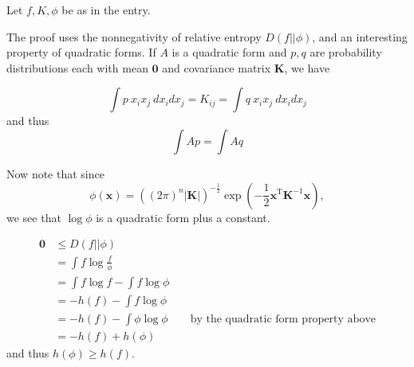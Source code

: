 \documentclass{article}
\newcommand{\mv}[1]{\mathbf{#1}}	%
\newcommand{\mvt}[1]{\mv{#1}^{\mathrm{T}}}
\begin{document}
Let $f, K, \phi$ be as in the  entry.

The proof uses the nonnegativity of relative entropy $D(f||\phi)$, and an interesting  property of quadratic forms.  If $A$ is a quadratic form and $p,q$ are probability distributions each with mean $\mv{0}$ and covariance matrix $\mv{K}$, we have

\begin{equation}
\int p\ x_i x_j\ dx_i dx_j = K_{ij} = \int q\ x_i x_j\ dx_i dx_j
\end{equation}
and thus
\begin{equation}
\int A p = \int A q
\end{equation}

Now note that since
\begin{equation}
\phi(\mv{x}) = \left((2\pi)^n |\mv{K}| \right)^{-\frac{1}{2}} \exp{(- \frac{1}{2} \mvt{x} \mv{K}^{-1} \mv{x})},
\end{equation}
we see that $\log \phi$ is a quadratic form plus a constant.

\begin{eqnarray*}
\textbf{0} &\le D(f||\phi)\\
&= \int f \log \frac{f}{\phi}\\
&= \int f \log f - \int f \log \phi\\
&= -h(f) - \int f \log \phi\\
&= -h(f) - \int \phi \log \phi \qquad \text{by the quadratic form property above}\\
&= -h(f) + h(\phi)
\end{eqnarray*}
and thus $h(\phi) \ge h(f)$.
\end{document}
